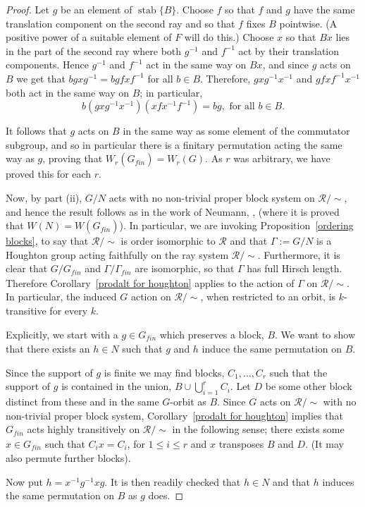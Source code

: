 \documentclass[11pt,a4paper]{amsart}
\theoremstyle{definition}
\theoremstyle{remark}
\newcommand{\Ra}{\mathcal{R}}
\newcommand{\gfin}{G_{\textit{fin}}}
\newcommand{\gamfin}{\Gamma_{\textit{fin}}}
\newcommand{\stab}{\operatorname{stab}}
\begin{document}
\begin{proof}
	
	Let $g$ be an element of $\stab\{B\}$. Choose $f$ so that $f$ and $g$ have the same translation component on the second ray and so that $f$ fixes $B$ pointwise. (A positive power of a suitable element of $F$ will do this.) Choose $x$ so that $Bx$ lies in the part of the second ray where both $g^{-1}$ and $f^{-1}$ act by their translation components. Hence $g^{-1}$ and $f^{-1}$ act in the same way on $Bx$, and since $g$ acts on $B$ we get that $bgxg^{-1}= bgfxf^{-1}$ for all $b \in B$. Therefore, $gxg^{-1}x^{-1}$ and $gfxf^{-1}x^{-1}$ both act in the same way on $B$; in particular, 
	$$
	b(gx g^{-1}x^{-1})( x f x^{-1}f^{-1}) = bg, \text{ for all } b \in B.
	$$
	
	 It follows that $g$ acts on $B$ in the same way as some element of the commutator subgroup, and so in particular there is a finitary permutation acting the same way as $g$, proving that $W_r(\gfin) = W_r(G)$. As $r$ was arbitrary, we have proved this for each $r$. 
	
	
	
	Now, by part (ii), $G/N$ acts with no non-trivial proper block system on $\Ra/\sim$, and hence the result follows as in the work of Neumann, \cite[\S5, Lemma 5.4]{MR0401928}, (where it is proved that $W(N) = W(\gfin)$). In particular, we are invoking Proposition~\ref{ordering blocks}, to say that $\Ra/\sim$ is order isomorphic to $\Ra$ and that $\Gamma:=G/N$ is a Houghton group acting faithfully on the ray system $\Ra/\sim$. Furthermore, it is clear that $G/\gfin$ and $\Gamma/\gamfin$ are isomorphic, so that $\Gamma$ has full Hirsch length. Therefore Corollary~\ref{prodalt for houghton} applies to the action of $\Gamma$ on $\Ra/\sim$.  In particular, the induced $G$ action on $\Ra/\sim$, when restricted to an orbit, is $k$-transitive for every $k$. 
	
	Explicitly, we start with a $g \in \gfin$ which preserves a block, $B$. We want to show that there exists an $h \in N$ such that $g$ and $h$ induce the same permutation on $B$. 
	
	Since the support of $g$ is finite we may find blocks, $C_1, \ldots, C_r$ such that the support of $g$ is contained in the union, $B \cup  \bigcup_{i=1}^r C_i$. Let $D$ be some other block distinct from these and in the same $G$-orbit as $B$. Since $G$ acts on $\Ra/\sim$ with no non-trivial proper block system, Corollary~\ref{prodalt for houghton} implies that $\gfin$ acts highly transitively on $\Ra/\sim$ in the following sense; there exists some $x \in \gfin$ such that $C_i x = C_i$, for $1 \leq i \leq r$ and $x$ transposes $B$ and $D$. (It may also permute further blocks). 
	
	Now put $h=x^{-1} g^{-1} xg$. It is then readily checked that $h \in N$ and that $h$ induces the same permutation on $B$ as $g$ does. 
\end{proof}
\end{document}
